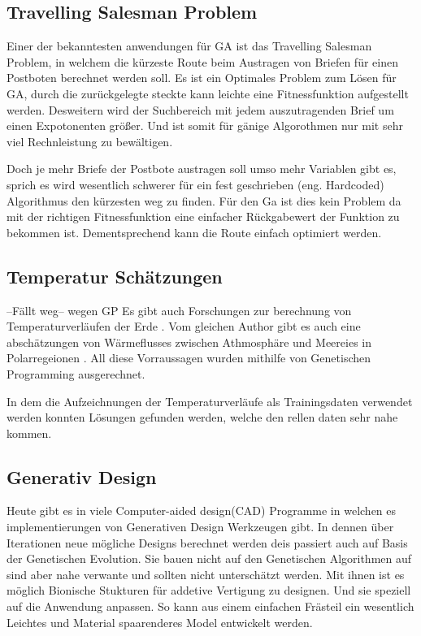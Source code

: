 \subsection{Travelling Salesman Problem}
Einer der bekanntesten anwendungen für GA ist das Travelling Salesman Problem, in welchem die kürzeste Route beim Austragen von Briefen für einen Postboten berechnet werden soll. Es ist ein Optimales Problem zum Lösen für GA, durch die zurückgelegte steckte kann leichte eine Fitnessfunktion aufgestellt werden. Desweitern wird der Suchbereich mit jedem auszutragenden Brief um einen Expotonenten größer. Und ist somit für gänige Algorothmen nur mit sehr viel Rechnleistung zu bewältigen.

 Doch je mehr Briefe der Postbote austragen soll umso mehr Variablen gibt es, sprich es wird wesentlich schwerer für ein fest geschrieben (eng. Hardcoded) Algorithmus den kürzesten weg zu finden. Für den Ga ist dies kein Problem da mit der richtigen Fitnessfunktion eine einfacher Rückgabewert der Funktion zu bekommen ist. Dementsprechend kann die Route einfach optimiert werden.

\subsection{Temperatur Schätzungen}
--Fällt weg-- wegen GP 
Es gibt auch Forschungen zur berechnung von Temperaturverläufen der Erde \cite{Stanislawska1}. Vom gleichen Author gibt es auch eine abschätzungen von Wärmeflusses zwischen Athmosphäre und Meereies in Polarregeionen \cite{Stanislawska,2}. All diese Vorraussagen wurden mithilfe von Genetischen Programming ausgerechnet. 

In dem die Aufzeichnungen der Temperaturverläufe als Trainingsdaten verwendet werden konnten Lösungen gefunden werden, welche den rellen daten sehr nahe kommen.

\subsection{Generativ Design}
Heute gibt es in viele Computer-aided design(CAD) Programme in welchen es implementierungen von Generativen Design Werkzeugen gibt. In dennen über Iterationen neue mögliche Designs berechnet werden deis passiert auch auf Basis der Genetischen Evolution. Sie bauen nicht auf den Genetischen Algorithmen auf sind aber nahe verwante und sollten nicht unterschätzt werden. 
Mit ihnen ist es möglich Bionische Stukturen für addetive Vertigung zu designen. Und sie speziell auf die Anwendung anpassen. So kann aus einem einfachen Frästeil ein wesentlich Leichtes und Material spaarenderes Model entwickelt werden.

